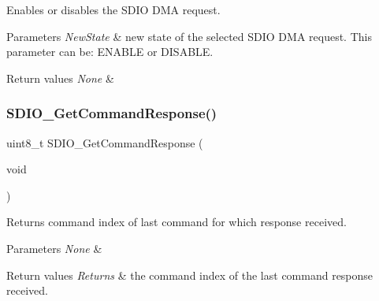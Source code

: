 Enables or disables the S\+D\+IO D\+MA request. 


\begin{DoxyParams}{Parameters}
{\em New\+State} & new state of the selected S\+D\+IO D\+MA request. This parameter can be\+: E\+N\+A\+B\+LE or D\+I\+S\+A\+B\+LE. \\
\hline
\end{DoxyParams}

\begin{DoxyRetVals}{Return values}
{\em None} & \\
\hline
\end{DoxyRetVals}
\mbox{\label{group___s_d_i_o___private___functions_ga9badf271c818e09da301d715c4ad0e5b}} 
\subsubsection{\texorpdfstring{SDIO\_GetCommandResponse()}{SDIO\_GetCommandResponse()}}
{\footnotesize\ttfamily uint8\+\_\+t S\+D\+I\+O\+\_\+\+Get\+Command\+Response (\begin{DoxyParamCaption}\item[{void}]{ }\end{DoxyParamCaption})}



Returns command index of last command for which response received. 


\begin{DoxyParams}{Parameters}
{\em None} & \\
\hline
\end{DoxyParams}

\begin{DoxyRetVals}{Return values}
{\em Returns} & the command index of the last command response received. \\
\hline
\end{DoxyRetVals}
\mbox{\label{group___s_d_i_o___private___functions_ga7a28aaa2c25a9a5a8db1f49b0e8c9d0a}} 
